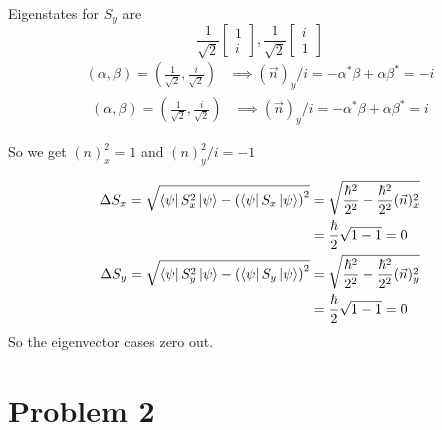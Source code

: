 \documentclass[letter, 10pts]{article}
\newcommand{\hb}{\hbar}
\begin{document}
Eigenstates for $S_y$ are 
\[
\frac{1}{\sqrt{2} } \begin{bmatrix} 1 \\ i \end{bmatrix} , 
\frac{1}{\sqrt{2} } \begin{bmatrix} i \\ 1 \end{bmatrix} 
\] 
\begin{align*}
	\left(\alpha, \beta\right) = \left(\frac{1}{\sqrt{2} }, \frac{i}{\sqrt{2} }\right) &\implies 
	(\vec{n})_y / i  = - \alpha ^{*} \beta + \alpha \beta^{*} =   - i 
\end{align*}
\begin{align*}
	\left(\alpha, \beta\right) = \left(\frac{1}{\sqrt{2} }, \frac{i}{\sqrt{2} }\right) &\implies 
	(\vec{n})_y  / i = - \alpha ^{*} \beta + \alpha \beta^{*} =   i 
\end{align*}

So we get $(n)_x^2 = 1$ and $(n)_y^2 / i  = -1 $ 

\begin{align*}
	\Delta S_x =
	\sqrt{
\bra{\psi} S_x^2 \ket{\psi} - 
\left(
\bra{\psi} S_x \ket{\psi} 
\right)^2
	}  &= 
\sqrt{
\frac{\hb^2}{2^2 } - 
\frac{\hb^2}{2^2} (\vec{n})_x  ^2
} 
	\\ 
	&= 
\frac{\hb}{2}
\sqrt{
1 -  1 
} = 0 
	\\
	\Delta S_y =
	\sqrt{
\bra{\psi} S_y^2 \ket{\psi} - 
\left(
\bra{\psi} S_y \ket{\psi} 
\right)^2
	}  &= 
\sqrt{
\frac{\hb^2}{2^2 } - 
\frac{\hb^2}{2^2} (\vec{n})_y  ^2
} 
	\\ 
	&= 
\frac{\hb}{2}
\sqrt{
1 -1 
}  = 0 
\end{align*}
So the eigenvector cases zero out. 
\section*{Problem 2}
\end{document}
